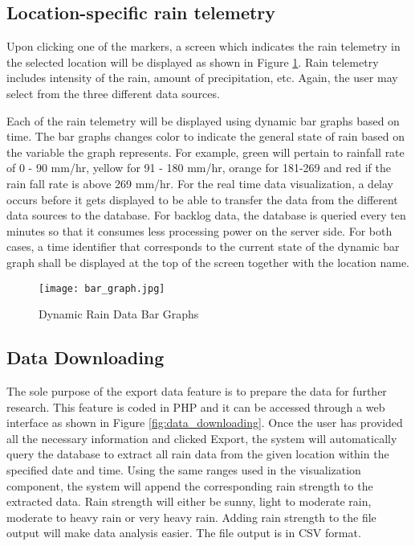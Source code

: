 \subsection{Location-specific rain telemetry}
Upon clicking one of the markers, a screen which indicates the rain telemetry in the selected location will be displayed as shown in Figure \ref{fig:bar_graph}. Rain telemetry includes intensity of the rain, amount of precipitation, etc. Again, the user may select from the three different data sources. 

\bigskip
Each of the rain telemetry will be displayed using dynamic bar graphs based on time. The bar graphs changes color to indicate the general state of rain based on the variable the graph represents. For example, green will pertain to rainfall rate of 0 - 90 mm/hr, yellow for 91 - 180 mm/hr, orange for 181-269 and red if the rain fall rate is above 269 mm/hr. For the real time data visualization, a delay occurs before it gets displayed to be able to transfer the data from the different data sources to the database. For backlog data, the database is queried every ten minutes so that it consumes less processing power on the server side. For both cases, a time identifier that corresponds to the current state of the dynamic bar graph shall be displayed at the top of the screen together with the location name.

\begin{figure}
    \centering
        \texttt{[image: bar\_graph.jpg]}
    \caption{Dynamic Rain Data Bar Graphs}
    \label{fig:bar_graph}
\end{figure}

\subsection{Data Downloading}
The sole purpose of the export data feature is to prepare the data for further research. This feature is coded in PHP and it can be accessed through a web interface as shown in Figure \ref{fig:data_downloading}. Once the user has provided all the necessary information and clicked Export, the system will automatically query the database to extract all rain data from the given location within the specified date and time. Using the same ranges used in the visualization component, the system will append the corresponding rain strength to the extracted data. Rain strength will either be sunny, light to moderate rain, moderate to heavy rain or very heavy rain. Adding rain strength to the file output will make data analysis easier. The file output is in CSV format.

